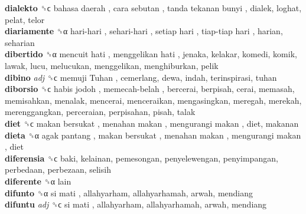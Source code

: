 \textbf{dialekto} ␝ϲ   bahasa daerah ,  cara sebutan ,  tanda tekanan bunyi , dialek, loghat, pelat, telor  \\
\textbf{diariamente} ␝α   hari-hari ,  sehari-hari ,  setiap hari ,  tiap-tiap hari , harian, seharian  \\
\textbf{dibertido} ␝α   mencuit hati ,  menggelikan hati , jenaka, kelakar, komedi, komik, lawak, lucu, melucukan, menggelikan, menghiburkan, pelik  \\
\textbf{dibino} \emph{adj}  ␝ϲ   memuji Tuhan , cemerlang, dewa, indah, terinspirasi, tuhan  \\
\textbf{diborsio} ␝ϲ   habis jodoh ,  memecah-belah , bercerai, berpisah, cerai, memasah, memisahkan, menalak, mencerai, menceraikan, mengasingkan, meregah, merekah, merenggangkan, perceraian, perpisahan, pisah, talak  \\
\textbf{diet} ␝ϲ   makan bersukat ,  menahan makan ,  mengurangi makan , diet, makanan  \\
\textbf{dieta} ␝α   agak pantang ,  makan bersukat ,  menahan makan ,  mengurangi makan , diet  \\
\textbf{diferensia} ␝ϲ  baki, kelainan, pemesongan, penyelewengan, penyimpangan, perbedaan, perbezaan, selisih  \\
\textbf{diferente} ␝α  lain  \\
\textbf{difunto} ␝α   si mati , allahyarham, allahyarhamah, arwah, mendiang  \\
\textbf{difuntu} \emph{adj}  ␝ϲ   si mati , allahyarham, allahyarhamah, arwah, mendiang  \\
